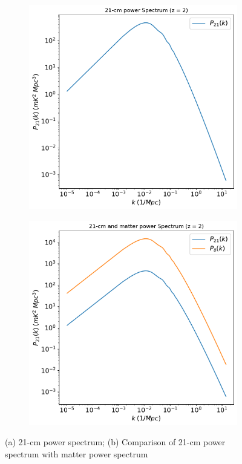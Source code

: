 \documentclass[12pt]{article}
\numberwithin{equation}{section}
\begin{document}
\begin{figure}
	\centering
	\begin{subfigure}{0.49\textwidth}
		\centering
		\includegraphics[width=\textwidth]{21cm-powspec_2}
		\caption{}
		\label{fig:21cm-powspec}
	\end{subfigure}
	\begin{subfigure}{0.49\textwidth}
		\centering
		\includegraphics[width=\textwidth]{21cm-matter-powspec_2}
		\caption{}
		\label{fig:21cm-matter-powspec}
	\end{subfigure}
	\caption{(a) 21-cm power spectrum; (b) Comparison of 21-cm power spectrum with matter power spectrum}
\end{figure}
\end{document}
